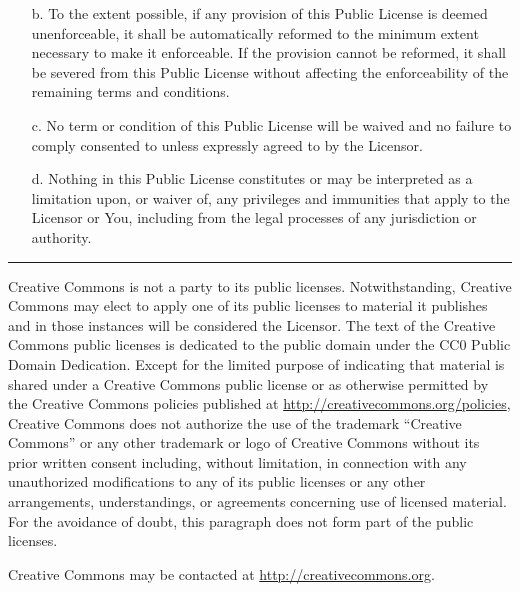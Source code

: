 \begin{scriptsize}
\begin{itemize}
\item[b.] To the extent possible, if any provision of this Public License is
     deemed unenforceable, it shall be automatically reformed to the
     minimum extent necessary to make it enforceable. If the provision
     cannot be reformed, it shall be severed from this Public License
     without affecting the enforceability of the remaining terms and
     conditions.

\item[c.] No term or condition of this Public License will be waived and no
     failure to comply consented to unless expressly agreed to by the
     Licensor.

\item[d.] Nothing in this Public License constitutes or may be interpreted
     as a limitation upon, or waiver of, any privileges and immunities
     that apply to the Licensor or You, including from the legal
     processes of any jurisdiction or authority.\\
\end{itemize}

\hrule

Creative Commons is not a party to its public
licenses. Notwithstanding, Creative Commons may elect to apply one of
its public licenses to material it publishes and in those instances
will be considered the Licensor. The text of the Creative Commons
public licenses is dedicated to the public domain under the CC0 Public
Domain Dedication. Except for the limited purpose of indicating that
material is shared under a Creative Commons public license or as
otherwise permitted by the Creative Commons policies published at
\url{http://creativecommons.org/policies}, Creative Commons does not authorize the
use of the trademark ``Creative Commons'' or any other trademark or logo
of Creative Commons without its prior written consent including,
without limitation, in connection with any unauthorized modifications
to any of its public licenses or any other arrangements,
understandings, or agreements concerning use of licensed material. For
the avoidance of doubt, this paragraph does not form part of the
public licenses.

Creative Commons may be contacted at \url{http://creativecommons.org}.

\end{scriptsize}
